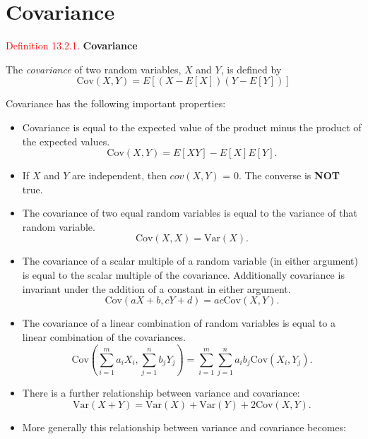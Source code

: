 \documentclass[
]{book}
\providecommand{\tightlist}{%
  \setlength{\itemsep}{0pt}\setlength{\parskip}{0pt}}
\begin{document}
\hypertarget{Correlation:Covariance}{%
\section{Covariance}\label{Correlation:Covariance}}

\leavevmode{}%
\textcolor{red}{Definition 13.2.1.}
{\textbf{Covariance}}

The \emph{covariance} of two random variables, \(X\) and \(Y\), is defined by\\

\[\text{Cov}(X,Y) = E\left[(X-E[X])(Y-E[Y])\right]\]

Covariance has the following important properties:

\begin{itemize}
\tightlist
\item
  Covariance is equal to the expected value of the product minus the product of the expected values.\\

  \[\text{Cov} (X,Y) = E[XY]-E[X]E[Y].\]
\item
  If \(X\) and \(Y\) are independent, then \(cov(X,Y)\) = 0. The converse is \textbf{NOT} true.\\
\item
  The covariance of two equal random variables is equal to the variance of that random variable.\\

  \[\text{Cov}(X,X) = \text{Var}(X).\]
\item
  The covariance of a scalar multiple of a random variable (in either argument) is equal to the scalar multiple of the covariance. Additionally covariance is invariant under the addition of a constant in either argument.\\

  \[\text{Cov} (aX+b,cY+d) = ac \text{Cov}(X,Y).\]
\item
  The covariance of a linear combination of random variables is equal to a linear combination of the covariances.\\

  \[\text{Cov} \left( \sum_{i=1}^m a_iX_i, \sum_{j=1}^n b_jY_j \right) = \sum_{i=1}^m \sum_{j=1}^n a_ib_j \text{Cov}(X_i,Y_j).\]
\item
  There is a further relationship between variance and covariance:\\

  \[\text{Var}(X+Y) = \text{Var}(X) + \text{Var}(Y) + 2\text{Cov}(X,Y).\]
\item
  More generally this relationship between variance and covariance becomes:\\


\end{itemize}
\end{document}
